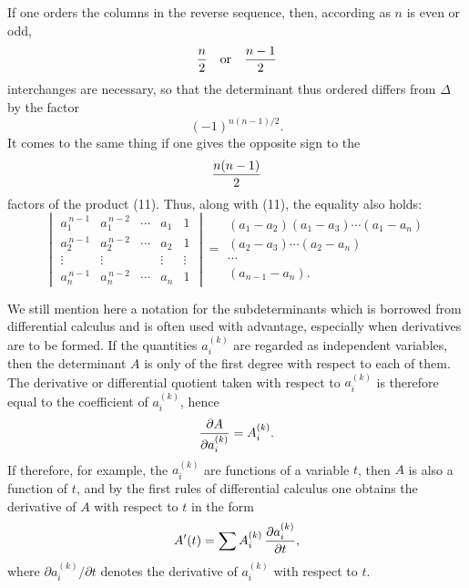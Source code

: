 
If one orders the columns in the reverse sequence, then, according as \(n\) is even or odd,
\[
 {n\over2}\quad\hbox{or}\quad {n-1\over2}
\]
interchanges are necessary, so that the determinant thus ordered differs from \(\Delta\) by the factor
\[
 (-1)^{n(n-1)/2}.
\]
It comes to the same thing if one gives the opposite sign to the
\[
 {n(n-1)\over2}
\]
factors of the product (11). Thus, along with (11), the equality also holds:
\begin{equation}
\begin{vmatrix}
a_1^{\,n-1}&a_1^{\,n-2}&\cdots&a_1&1\\
a_2^{\,n-1}&a_2^{\,n-2}&\cdots&a_2&1\\
\vdots&\vdots&&\vdots&\vdots\\
a_n^{\,n-1}&a_n^{\,n-2}&\cdots&a_n&1
\end{vmatrix}
=
\begin{gathered}
(a_1-a_2)(a_1-a_3)\cdots(a_1-a_n)\\
(a_2-a_3)\cdots(a_2-a_n)\\
\cdots\\
(a_{n-1}-a_n).
\end{gathered}
\tag{12}
\end{equation}

We still mention here a notation for the subdeterminants which is borrowed from differential calculus and is often used with advantage, especially when derivatives are to be formed. If the quantities \(a_i^{(k)}\) are regarded as independent variables, then the determinant \(A\) is only of the first degree with respect to each of them. The derivative or differential quotient taken with respect to \(a_i^{(k)}\) is therefore equal to the coefficient of \(a_i^{(k)}\), hence
\[
 {\partial A\over\partial a_i^{(k)}}=A_i^{(k)}.
\]
If therefore, for example, the \(a_i^{(k)}\) are functions of a variable \(t\), then \(A\) is also a function of \(t\), and by the first rules of differential calculus one obtains the derivative of \(A\) with respect to \(t\) in the form
\[
 A'(t)=\sum A_i^{(k)}\,{\partial a_i^{(k)}\over\partial t},
\]
where \({\partial a_i^{(k)}}/{\partial t}\) denotes the derivative of \(a_i^{(k)}\) with respect to \(t\).
